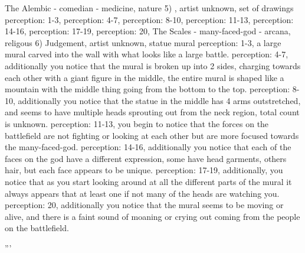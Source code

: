     The Alembic - comedian - medicine, nature
    5) , artist unknown, set of drawings
        perception: 1-3, 
        perception: 4-7, 
        perception: 8-10, 
        perception: 11-13, 
        perception: 14-16, 
        perception: 17-19, 
        perception: 20, 
    The Scales - many-faced-god - arcana, religous
    6) Judgement, artist unknown, statue mural
        perception: 1-3, a large mural carved into the wall with what looks like a large battle.
        perception: 4-7, additionally you notice that the mural is broken up into 2 sides, charging towards each other with a giant figure in the middle, the entire mural is shaped like a mountain with the middle thing going from the bottom to the top.
        perception: 8-10, additionally you notice that the statue in the middle has 4 arms outstretched, and seems to have multiple heads sprouting out from the neck region, total count is unknown.
        perception: 11-13, you begin to notice that the forces on the battlefield are not fighting or looking at each other but are more focused towards the many-faced-god.
        perception: 14-16, additionally you notice that each of the faces on the god have a different expression, some have head garments, others hair, but each face appears to be unique.
        perception: 17-19, additionally, you notice that as you start looking around at all the different parts of the mural it always appears that at least one if not many of the heads are watching you.
        perception: 20, additionally you notice that the mural seems to be moving or alive, and there is a faint sound of moaning or crying out coming from the people on the battlefield.
        
'''